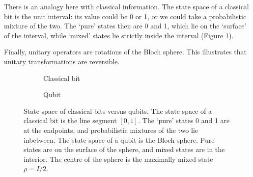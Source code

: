 \documentclass{article}
\makeatletter
\renewcommand\bra[1]{{\langle{#1}|}}
\renewcommand\ket[1]{
  \@ifnextchar\bra{\k@t{#1}\!}{\k@t{#1}}
}
\renewcommand\ket[1]{
  \@ifnextchar\braket{\k@t{#1}\!}{\k@t{#1}}
}
\newcommand\k@t[1]{{|{#1}\rangle}}
\theoremstyle{definition}
\makeatother
\begin{document}
There is an analogy here with classical information. The state space of a classical bit is the unit interval: its value could be 0 or 1, or we could take a probabilistic mixture of the two. The `pure' states then are 0 and 1, which lie on the `surface' of the interval, while `mixed' states lie strictly inside the interval (Figure \ref{fig:cbit_state_space}). 


Finally, unitary operators are rotations of the Bloch sphere. This illustrates that unitary transformations are reversible.

\begin{figure}
\centering
\begin{subfigure}{0.25\linewidth}
\centering
{}
\caption{Classical bit}
\label{fig:cbit_state_space}
\end{subfigure}%
\begin{subfigure}{0.75\linewidth}
\centering
{}
\caption{Qubit}
\label{fig:qubit_state_space}
\end{subfigure}

\caption{State space of classical bits versus qubits. The state space of a classical bit is the line segment $[0,1]$. The `pure' states 0 and 1 are at the endpoints, and probabilistic mixtures of the two lie inbetween. The state space of a qubit is the Bloch sphere. Pure states are on the surface of the sphere, and mixed states are in the interior. The centre of the sphere is the maximally mixed state $\rho=I/2$.}
\end{figure}


\end{document}
